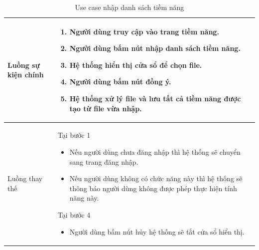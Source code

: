 \documentclass[12pt,a4paper]{article}
\begin{document}
\begin{table}[H]
\begin{tabular}{|p{3.5cm}|p{11.5cm}|c|}
            Luồng sự kiện chính & \vspace{-.8cm}\begin{enumerate}
                                                    \item Người dùng truy cập vào trang tiềm năng.
                                                    \item Người dùng bấm nút nhập danh sách tiềm năng.
                                                    \item Hệ thống hiển thị cửa sổ để chọn file.
                                                    \item Người dùng bấm nút đồng ý.
                                                    \item Hệ thống xử lý file và lưu tất cả tiềm năng được tạo từ file vừa nhập.
            \end{enumerate}
            \\
            \hline
            Luồng thay thế & Tại bước 1\newline
            \vspace{-.8cm}\begin{itemize}
                              \item Nếu người dùng chưa đăng nhập thì hệ thống sẽ chuyển sang trang đăng nhập.
                              \item Nếu người dùng không có chức năng này thì hệ thống sẽ thông báo người dùng không được phép thực hiện tính năng này.
            \end{itemize}
            Tại bước 4\newline
            \vspace{-.8cm}\begin{itemize}
                              \item Người dùng bấm nút hủy hệ thống sẽ tắt cửa sổ hiển thị.
            \end{itemize}
            \\ \hline
        \end{tabular}
        \caption{Use case nhập danh sách tiềm năng}
    \end{table}

\end{document}
